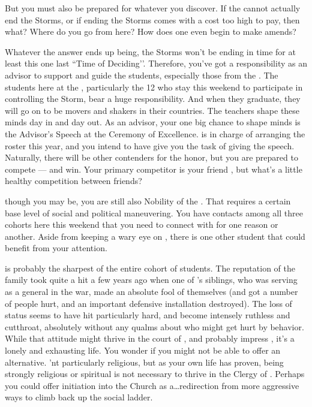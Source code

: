 \documentclass[char]{GL2020}
\begin{document}
 But you must also be prepared for whatever you discover. If the \pTech{} cannot actually end the Storms, or if ending the Storms comes with a cost too high to pay, then what? Where do you go from here? How does one even begin to make amends?

Whatever the answer ends up being, the Storms won't be ending in time for at least this one last ``Time of Deciding’’. Therefore, you've got a responsibility as an advisor to support and guide the students, especially those from the \pFarm{}. The students here at the \pSc{}, particularly the 12 who stay this weekend to participate in controlling the Storm, bear a huge responsibility. And when they graduate, they will go on to be movers and shakers in their countries. The teachers shape these minds day in and day out. As an advisor, your one big chance to shape minds is the Advisor's Speech at the Ceremony of Excellence. \cMusic{} is in charge of arranging the roster this year, and you intend to have \cMusic{\them} give you the task of giving the speech. Naturally, there will be other contenders for the honor, but you are prepared to compete — and win. Your primary competitor is your friend \cCurse{}, but what's a little healthy competition between friends?

\cHedonist{\Cleric} though you may be, you are still also Nobility of the \pFarm{}. That requires a certain base level of social and political maneuvering. You have contacts among all three cohorts here this weekend that you need to connect with for one reason or another. Aside from keeping a wary eye on \cDisney{}, there is one other student that could benefit from your attention.

\cLibAssist{} is probably the sharpest of the entire cohort of students. The reputation of the \cLibAssist{\formal} family took quite a hit a few years ago when one of \cLibAssist{}’s siblings, who was serving as a general in the war, made an absolute fool of themselves (and got a number of people hurt, and an important defensive installation destroyed). The loss of status seems to have hit \cLibAssist{} particularly hard, and \cLibAssist{\theyhave} become intensely ruthless and cutthroat, absolutely without any qualms about who might get hurt by \cLibAssist{\their} behavior. While that attitude might thrive in the court of \cQueen{\full}, and probably impress \cPrince{}, it’s a lonely and exhausting life. You wonder if you might not be able to offer \cLibAssist{} an alternative. \cLibAssist{\Theyare}’nt particularly religious, but as your own life has proven, being strongly religious or spiritual is not necessary to thrive in the Clergy of \cFarmGod{}. Perhaps you could offer initiation into the Church as a\ldots redirection from more aggressive ways to climb back up the social ladder.
\end{document}
